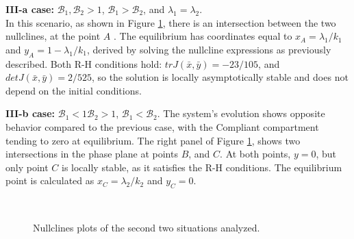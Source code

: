 \textbf{III-a case:} $\mathcal{B}_1, \mathcal{B}_2 >1$, $\mathcal{B}_1 >  \mathcal{B}_2$, and $\lambda_1 = \lambda_2$. \\
In this scenario, as shown in Figure \ref{fig:nullcline_B1_mag_B2}, there is an intersection between the two nullclines, at the point $A$ . The equilibrium has coordinates equal to $x_A = \lambda_1/k_1$ and $y_A = 1 - \lambda_1/k_1 $, derived by solving the nullcline expressions as previously described. Both R-H conditions hold: $trJ(\bar{x},\bar{y}) = -23/105$, and $detJ(\bar{x},\bar{y}) = 2/525$, so the solution is locally asymptotically stable and does not depend on the initial conditions.

\textbf{III-b case: }$\mathcal{B}_1<1 \mathcal{B}_2 >1$, $\mathcal{B}_1 <  \mathcal{B}_2$.
The system's evolution shows opposite behavior compared to the previous case, with the Compliant compartment tending to zero at equilibrium. The right panel of Figure \ref{fig:nullcline_B1_mag_B2}, shows two intersections in the phase plane at points $B$, and $C$. At both points, $y=0$, but only point $C$ is locally stable, as it satisfies the R-H conditions. The equilibrium point is calculated as $x_C= \lambda_2/k_2$ and $y_C = 0$.  
\begin{figure}[h]
	\centering
	 \quad
	 \\
	\caption[Nullclines second figure]{Nullclines plots of the second two situations analyzed.}
	\label{fig:nullcline_B1_mag_B2}
\end{figure}

